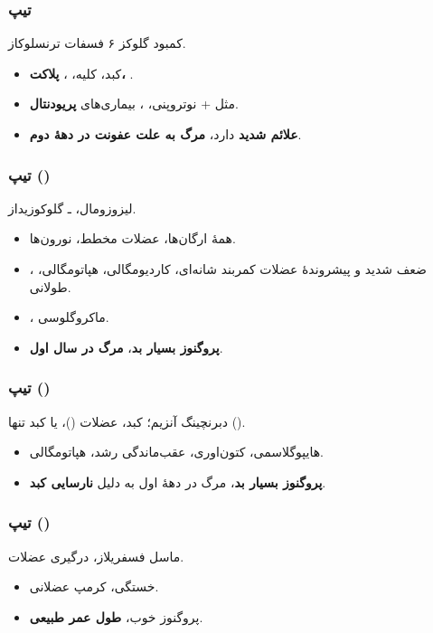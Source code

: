 \documentclass[12pt,a4paper]{article}
\begin{document}
\subsubsection*{تیپ }
کمبود گلوکز ۶ فسفات ترنسلوکاز.
\begin{itemize}
\item کبد، کلیه، ، \textbf{پلاکت، }.
\item مثل  + نوتروپنی، ، بیماری‌های \textbf{پریودنتال}.
\item \textbf{علائم  شدید} دارد، \textbf{مرگ به علت عفونت در دههٔ دوم}.
\end{itemize}

\subsubsection*{تیپ  ()}
لیزوزومال، \CDmath{\alpha} ـ گلوکوزیداز.
\begin{itemize}
\item همهٔ ارگان‌ها، عضلات مخطط، نورون‌ها.
\item ضعف شدید و پیشروندهٔ عضلات کمربند شانه‌ای، کاردیومگالی، هپاتومگالی، ،  طولانی.
\item {}، ماکروگلوسی.
\item \textbf{پروگنوز بسیار بد}، \textbf{مرگ در سال اول}.
\end{itemize}

\subsubsection*{تیپ  ()}
دبرنچینگ آنزیم؛ کبد، عضلات ()، یا کبد تنها ().
\begin{itemize}
\item هایپوگلاسمی، کتون‌اوری، عقب‌ماندگی رشد، هپاتومگالی.
\item \textbf{پروگنوز بسیار بد}، مرگ در دههٔ اول به دلیل \textbf{نارسایی کبد}.
\end{itemize}

\clearpage
{}
\subsubsection*{تیپ  ()}
ماسل فسفریلاز، درگیری عضلات.
\begin{itemize}
\item خستگی، کرمپ عضلانی.
\item پروگنوز خوب، \textbf{طول عمر طبیعی}.
\end{itemize}
\end{document}
